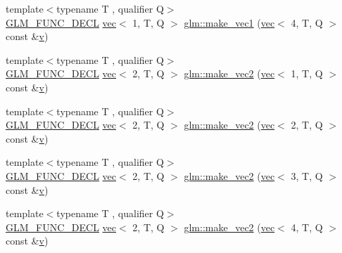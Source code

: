 \begin{DoxyCompactItemize}
\item 
{\footnotesize template$<$typename T , qualifier Q$>$ }\\\mbox{\hyperlink{setup_8hpp_ab2d052de21a70539923e9bcbf6e83a51}{G\+L\+M\+\_\+\+F\+U\+N\+C\+\_\+\+D\+E\+CL}} \mbox{\hyperlink{structglm_1_1vec}{vec}}$<$ 1, T, Q $>$ \mbox{\hyperlink{group__gtc__type__ptr_ga6af06bb60d64ca8bcd169e3c93bc2419}{glm\+::make\+\_\+vec1}} (\mbox{\hyperlink{structglm_1_1vec}{vec}}$<$ 4, T, Q $>$ const \&\mbox{\hyperlink{_s_d_l__opengl_8h_a10a82eabcb59d2fcd74acee063775f90}{v}})
\item 
{\footnotesize template$<$typename T , qualifier Q$>$ }\\\mbox{\hyperlink{setup_8hpp_ab2d052de21a70539923e9bcbf6e83a51}{G\+L\+M\+\_\+\+F\+U\+N\+C\+\_\+\+D\+E\+CL}} \mbox{\hyperlink{structglm_1_1vec}{vec}}$<$ 2, T, Q $>$ \mbox{\hyperlink{group__gtc__type__ptr_ga8476d0e6f1b9b4a6193cc25f59d8a896}{glm\+::make\+\_\+vec2}} (\mbox{\hyperlink{structglm_1_1vec}{vec}}$<$ 1, T, Q $>$ const \&\mbox{\hyperlink{_s_d_l__opengl_8h_a10a82eabcb59d2fcd74acee063775f90}{v}})
\item 
{\footnotesize template$<$typename T , qualifier Q$>$ }\\\mbox{\hyperlink{setup_8hpp_ab2d052de21a70539923e9bcbf6e83a51}{G\+L\+M\+\_\+\+F\+U\+N\+C\+\_\+\+D\+E\+CL}} \mbox{\hyperlink{structglm_1_1vec}{vec}}$<$ 2, T, Q $>$ \mbox{\hyperlink{group__gtc__type__ptr_gae54bd325a08ad26edf63929201adebc7}{glm\+::make\+\_\+vec2}} (\mbox{\hyperlink{structglm_1_1vec}{vec}}$<$ 2, T, Q $>$ const \&\mbox{\hyperlink{_s_d_l__opengl_8h_a10a82eabcb59d2fcd74acee063775f90}{v}})
\item 
{\footnotesize template$<$typename T , qualifier Q$>$ }\\\mbox{\hyperlink{setup_8hpp_ab2d052de21a70539923e9bcbf6e83a51}{G\+L\+M\+\_\+\+F\+U\+N\+C\+\_\+\+D\+E\+CL}} \mbox{\hyperlink{structglm_1_1vec}{vec}}$<$ 2, T, Q $>$ \mbox{\hyperlink{group__gtc__type__ptr_ga0084fea4694cf47276e9cccbe7b1015a}{glm\+::make\+\_\+vec2}} (\mbox{\hyperlink{structglm_1_1vec}{vec}}$<$ 3, T, Q $>$ const \&\mbox{\hyperlink{_s_d_l__opengl_8h_a10a82eabcb59d2fcd74acee063775f90}{v}})
\item 
{\footnotesize template$<$typename T , qualifier Q$>$ }\\\mbox{\hyperlink{setup_8hpp_ab2d052de21a70539923e9bcbf6e83a51}{G\+L\+M\+\_\+\+F\+U\+N\+C\+\_\+\+D\+E\+CL}} \mbox{\hyperlink{structglm_1_1vec}{vec}}$<$ 2, T, Q $>$ \mbox{\hyperlink{group__gtc__type__ptr_ga2b81f71f3a222fe5bba81e3983751249}{glm\+::make\+\_\+vec2}} (\mbox{\hyperlink{structglm_1_1vec}{vec}}$<$ 4, T, Q $>$ const \&\mbox{\hyperlink{_s_d_l__opengl_8h_a10a82eabcb59d2fcd74acee063775f90}{v}})

\end{DoxyCompactItemize}
